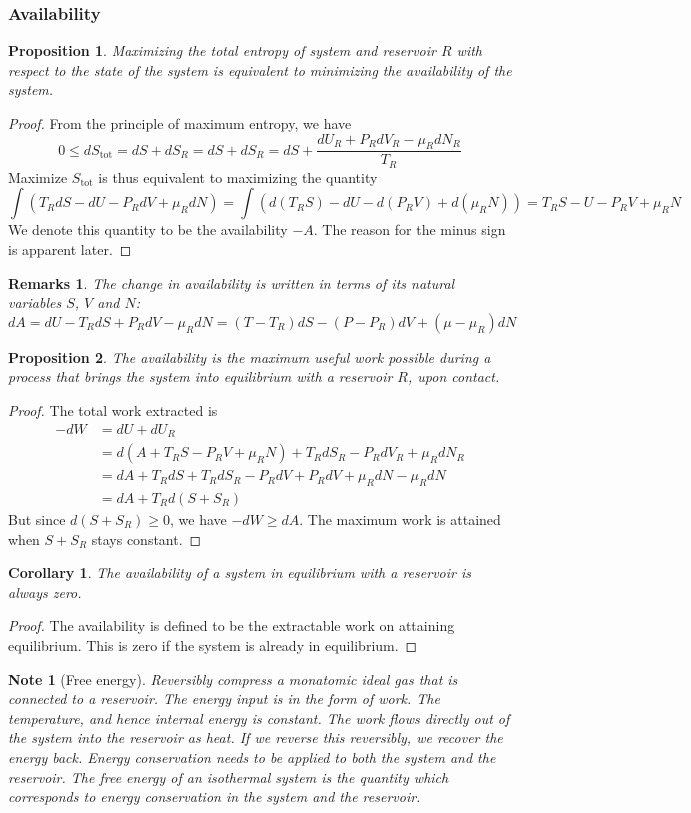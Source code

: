 \documentclass[a4paper]{article}
\newtheorem{remarks}{Remarks}[section]
\newtheorem{Note}{Note}[section]
\theoremstyle{new}
\newtheorem{prop}{Proposition}[section]
\newtheorem{cor}{Corollary}[section]
\begin{document}
\subsubsection*{Availability}
\begin{prop}
Maximizing the total entropy of system and reservoir $R$ with respect to the state of the system is equivalent to minimizing the availability of the system.
\end{prop}
\begin{proof}
From the principle of maximum entropy, we have
$$0\leq dS_{\text{tot}}=dS+dS_R=dS+dS_R=dS+\frac{dU_R+P_RdV_R-\mu_RdN_R}{T_R}$$
Maximize $S_{\text{tot}}$ is thus equivalent to maximizing the quantity
$$\int(T_RdS-dU-P_RdV+\mu_RdN)=\int(d(T_RS)-dU-d(P_RV)+d(\mu_RN))=T_RS-U-P_RV+\mu_RN$$
We denote this quantity to be the availability $-A$. The reason for the minus sign is apparent later.
\end{proof}
\begin{remarks}
The change in availability is written in terms of its natural variables $S$, $V$ and $N$:
$$dA=dU-T_RdS+P_RdV-\mu_RdN=(T-T_R)dS-(P-P_R)dV+(\mu-\mu_R)dN$$
\end{remarks}
\begin{prop}
The availability is the maximum useful work possible during a process that brings the system into equilibrium with a reservoir $R$, upon contact.
\end{prop}
\begin{proof}
The total work extracted is
\begin{align}
-dW&=dU+dU_R\nonumber\\&=d(A+T_RS-P_RV+\mu_RN)+T_RdS_R-P_RdV_R+\mu_RdN_R\nonumber\\&=dA+T_RdS+T_RdS_R-P_RdV+P_RdV+\mu_RdN-\mu_RdN\nonumber\\&=dA+T_Rd(S+S_R)\nonumber
\end{align}
But since $d(S+S_R)\geq0$, we have $-dW\geq dA$. The maximum work is attained when $S+S_R$ stays constant.
\end{proof}
\begin{cor}
The availability of a system in equilibrium with a reservoir is always zero.
\end{cor}
\begin{proof}
The availability is defined to be the extractable work on attaining equilibrium. This is zero if the system is already in equilibrium.
\end{proof}
\begin{Note}[Free energy]
Reversibly compress a monatomic ideal gas that is connected to a reservoir. The energy input is in the form of work. The temperature, and hence internal energy is constant. The work flows directly out of the system into the reservoir as heat. If we reverse this reversibly, we recover the energy back. Energy conservation needs to be applied to both the system and the reservoir. The free energy of an isothermal system is the quantity which corresponds to energy conservation in the system and the reservoir.
\end{Note}
\end{document}
